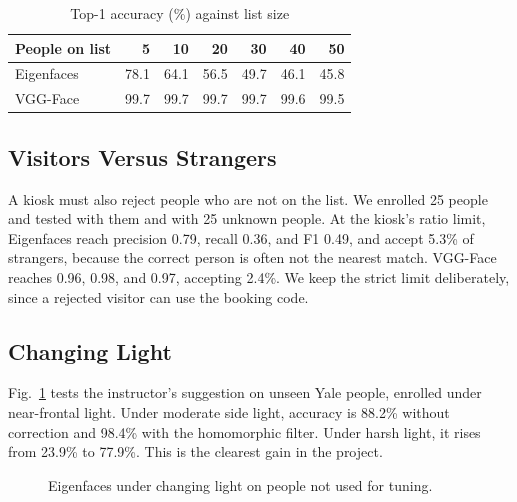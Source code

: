 \documentclass[conference,a4paper]{IEEEtran}
\begin{document}
\begin{table}[t]
\caption{Top-1 accuracy (\%) against list size}
\label{tab:list}
\centering\footnotesize
\begin{tabular}{@{}lrrrrrr@{}}
\toprule
People on list & 5 & 10 & 20 & 30 & 40 & 50 \\
\midrule
Eigenfaces & 78.1 & 64.1 & 56.5 & 49.7 & 46.1 & 45.8 \\
VGG-Face & 99.7 & 99.7 & 99.7 & 99.7 & 99.6 & 99.5 \\
\bottomrule
\end{tabular}
\end{table}

\subsection{Visitors Versus Strangers}
A kiosk must also reject people who are not on the list. We enrolled 25 people and tested with them and with 25 unknown people. At the kiosk's ratio limit, Eigenfaces reach precision 0.79, recall 0.36, and F1 0.49, and accept 5.3\% of strangers, because the correct person is often not the nearest match. VGG-Face reaches 0.96, 0.98, and 0.97, accepting 2.4\%. We keep the strict limit deliberately, since a rejected visitor can use the booking code.

\subsection{Changing Light}
Fig.~\ref{fig:light} tests the instructor's suggestion on unseen Yale people, enrolled under near-frontal light. Under moderate side light, accuracy is 88.2\% without correction and 98.4\% with the homomorphic filter. Under harsh light, it rises from 23.9\% to 77.9\%. This is the clearest gain in the project.

\begin{figure}[t]
\centering
{}
\caption{Eigenfaces under changing light on people not used for tuning.}
\label{fig:light}
\end{figure}
\end{document}
